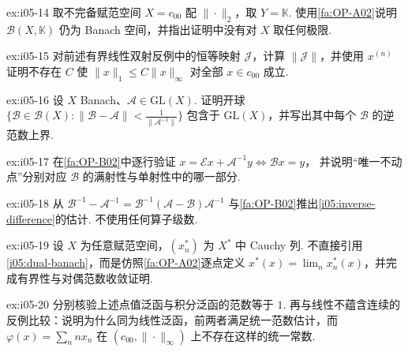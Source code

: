 \begin{FAExercise}[定义域无需完备]{ex:i05-14}
取不完备赋范空间 \(\displaystyle X=c_{00}\) 配 \(\displaystyle \|\cdot\|_2\)，取 \(\displaystyle Y=\mathbb K\). 使用\autoref{fa:OP-A02}说明 \(\displaystyle \mathcal B(X,\mathbb K)\) 仍为 Banach 空间，并指出证明中没有对 \(\displaystyle X\) 取任何极限.
\end{FAExercise}

\begin{FAExercise}[有界双射与有界逆]{ex:i05-15}
对前述有界线性双射反例中的恒等映射 \(\displaystyle \mathcal J\)，计算 \(\displaystyle \|\mathcal J\|\)，并使用 \(\displaystyle x^{(n)}\) 证明不存在 \(\displaystyle C\) 使 \(\displaystyle \|x\|_1\leqslant C\|x\|_\infty\) 对全部 \(\displaystyle x\in c_{00}\) 成立.
\end{FAExercise}

\begin{FAExercise}[局部可逆半径]{ex:i05-16}
设 \(\displaystyle X\) Banach、\(\displaystyle \mathcal A\in\mathrm{GL}(X)\). 证明开球 \(\displaystyle \{\mathcal B\in\mathcal B(X):\|\mathcal B-\mathcal A\|<\frac{1}{\|\mathcal A^{-1}\|}\}\)
包含于 \(\displaystyle \mathrm{GL}(X)\)，并写出其中每个 \(\displaystyle \mathcal B\) 的逆范数上界.
\end{FAExercise}

\begin{FAExercise}[压缩映射中的方程等价]{ex:i05-17}
在\autoref{fa:OP-B02}中逐行验证 \(\displaystyle x=\mathcal E x+\mathcal A^{-1}y \iff \mathcal Bx=y\)，
并说明“唯一不动点”分别对应 \(\displaystyle \mathcal B\) 的满射性与单射性中的哪一部分.
\end{FAExercise}

\begin{FAExercise}[逆映射差估计]{ex:i05-18}
从 \(\displaystyle \mathcal B^{-1}-\mathcal A^{-1}=\mathcal B^{-1}(\mathcal A-\mathcal B)\mathcal A^{-1}\) 与\autoref{fa:OP-B02}推出\autoref{i05:inverse-difference}的估计. 不使用任何算子级数.
\end{FAExercise}

\begin{FAExercise}[连续对偶的完备性]{ex:i05-19}
设 \(\displaystyle X\) 为任意赋范空间，\(\displaystyle (x_n^*)\) 为 \(\displaystyle X^*\) 中 Cauchy 列. 不直接引用\autoref{i05:dual-banach}，而是仿照\autoref{fa:OP-A02}逐点定义 \(\displaystyle x^*(x)=\lim_n x_n^*(x)\)，并完成有界性与对偶范数收敛证明.
\end{FAExercise}

\begin{FAExercise}[点值、积分与不连续泛函]{ex:i05-20}
分别核验上述点值泛函与积分泛函的范数等于 \(\displaystyle1\). 再与线性不蕴含连续的反例比较：说明为什么同为线性泛函，前两者满足统一范数估计，而 \(\displaystyle \varphi(x)=\sum_n n x_n\) 在 \(\displaystyle (c_{00},\|\cdot\|_\infty)\) 上不存在这样的统一常数.
\end{FAExercise}
